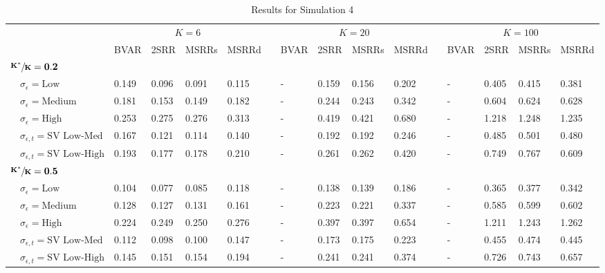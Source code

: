\begin{table}[!tbp]
\caption{Results for Simulation 4\label{s1_table}} 
\begin{center}
\begin{tabular}{lllllcllllcllll}
\hline\hline
\multicolumn{1}{l}{\bfseries }&\multicolumn{4}{c}{\bfseries $K=6$}&\multicolumn{1}{c}{\bfseries }&\multicolumn{4}{c}{\bfseries $K=20$}&\multicolumn{1}{c}{\bfseries }&\multicolumn{4}{c}{\bfseries $K=100$}\tabularnewline
\cline{2-5} \cline{7-10} \cline{12-15}
\multicolumn{1}{l}{}&\multicolumn{1}{c}{BVAR}&\multicolumn{1}{c}{2SRR}&\multicolumn{1}{c}{MSRRs}&\multicolumn{1}{c}{MSRRd}&\multicolumn{1}{c}{}&\multicolumn{1}{c}{BVAR}&\multicolumn{1}{c}{2SRR}&\multicolumn{1}{c}{MSRRs}&\multicolumn{1}{c}{MSRRd}&\multicolumn{1}{c}{}&\multicolumn{1}{c}{BVAR}&\multicolumn{1}{c}{2SRR}&\multicolumn{1}{c}{MSRRs}&\multicolumn{1}{c}{MSRRd}\tabularnewline
\hline
{\bfseries $\mathbf{\sfrac{K^*}{K}=0.2}$}&&&&&&&&&&&&&&\tabularnewline
~~$\sigma_{\epsilon} =\text{Low}$& 0.149& 0.096& 0.091& 0.115&&-& 0.159& 0.156& 0.202&&-& 0.405& 0.415& 0.381\tabularnewline
~~$\sigma_{\epsilon} =\text{Medium}$& 0.181& 0.153& 0.149& 0.182&&-& 0.244& 0.243& 0.342&&-& 0.604& 0.624& 0.628\tabularnewline
~~$\sigma_{\epsilon} =\text{High}$& 0.253& 0.275& 0.276& 0.313&&-& 0.419& 0.421& 0.680&&-& 1.218& 1.248& 1.235\tabularnewline
~~$\sigma_{\epsilon,t} = \text{SV Low-Med}$& 0.167& 0.121& 0.114& 0.140&&-& 0.192& 0.192& 0.246&&-& 0.485& 0.501& 0.480\tabularnewline
~~$\sigma_{\epsilon,t}  = \text{SV Low-High}$& 0.193& 0.177& 0.178& 0.210&&-& 0.261& 0.262& 0.420&&-& 0.749& 0.767& 0.609\tabularnewline
\hline
{\bfseries $\mathbf{\sfrac{K^*}{K}=0.5}$}&&&&&&&&&&&&&&\tabularnewline
~~$\sigma_{\epsilon} =\text{Low}$& 0.104& 0.077& 0.085& 0.118&&-& 0.138& 0.139& 0.186&&-& 0.365& 0.377& 0.342\tabularnewline
~~$\sigma_{\epsilon} =\text{Medium}$& 0.128& 0.127& 0.131& 0.161&&-& 0.223& 0.221& 0.337&&-& 0.585& 0.599& 0.602\tabularnewline
~~$\sigma_{\epsilon} =\text{High}$& 0.224& 0.249& 0.250& 0.276&&-& 0.397& 0.397& 0.654&&-& 1.211& 1.243& 1.262\tabularnewline
~~$\sigma_{\epsilon,t} = \text{SV Low-Med}$& 0.112& 0.098& 0.100& 0.147&&-& 0.173& 0.175& 0.223&&-& 0.455& 0.474& 0.445\tabularnewline
~~$\sigma_{\epsilon,t}  = \text{SV Low-High}$& 0.145& 0.151& 0.154& 0.194&&-& 0.241& 0.241& 0.374&&-& 0.726& 0.743& 0.657\tabularnewline

\end{tabular}
\end{center}
\end{table}
